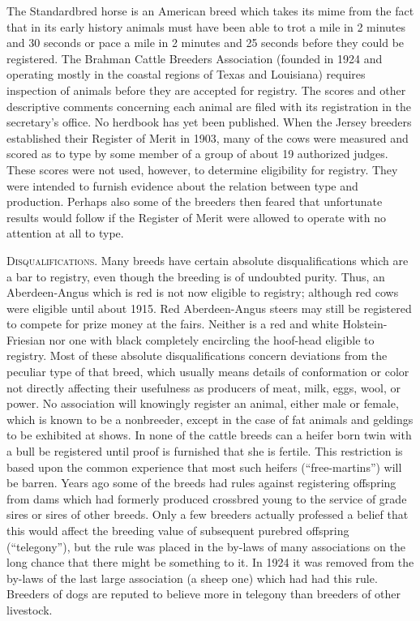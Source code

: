 The Standardbred horse is an American breed which takes its mime
from the fact that in its early history animals must have been able to
trot a mile in 2 minutes and 30 seconds or pace a mile in 2 minutes and
25 seconds before they could be registered. The Brahman Cattle Breeders
Association (founded in 1924 and operating mostly in the coastal
regions of Texas and Louisiana) requires inspection of animals before
they are accepted for registry. The scores and other descriptive comments
concerning each animal are filed with its registration in the
secretary's office. No herdbook has yet been published. When the Jersey
breeders established their Register of Merit in 1903, many of the cows
were measured and scored as to type by some member of a group of
about 19 authorized judges. These scores were not used, however, to
determine eligibility for registry. They were intended to furnish evidence
about the relation between type and production. Perhaps also
some of the breeders then feared that unfortunate results would follow
if the Register of Merit were allowed to operate with no attention at all
to type.

\textsc{Disqualifications}. Many breeds have certain absolute disqualifications
which are a bar to registry, even though the breeding is of
undoubted purity. Thus, an Aberdeen-Angus which is red is not now
eligible to registry; although red cows were eligible until about 1915.
Red Aberdeen-Angus steers may still be registered to compete for prize
money at the fairs. Neither is a red and white Holstein-Friesian nor one
with black completely encircling the hoof-head eligible to registry. Most
of these absolute disqualifications concern deviations from the peculiar
type of that breed, which usually means details of conformation or
color not directly affecting their usefulness as producers of meat, milk,
eggs, wool, or power. No association will knowingly register an animal,
either male or female, which is known to be a nonbreeder, except in the
case of fat animals and geldings to be exhibited at shows. In none of the
cattle breeds can a heifer born twin with a bull be registered until proof
is furnished that she is fertile. This restriction is based upon the common
experience that most such heifers (``free-martins'') will be barren.
Years ago some of the breeds had rules against registering offspring
from dams which had formerly produced crossbred young to the service
of grade sires or sires of other breeds. Only a few breeders actually professed
a belief that this would affect the breeding value of subsequent
purebred offspring (``telegony''), but the rule was placed in the by-laws
of many associations on the long chance that there might be something
to it. In 1924 it was removed from the by-laws of the last large association
(a sheep one) which had had this rule. Breeders of dogs are reputed
to believe more in telegony than breeders of other livestock.

